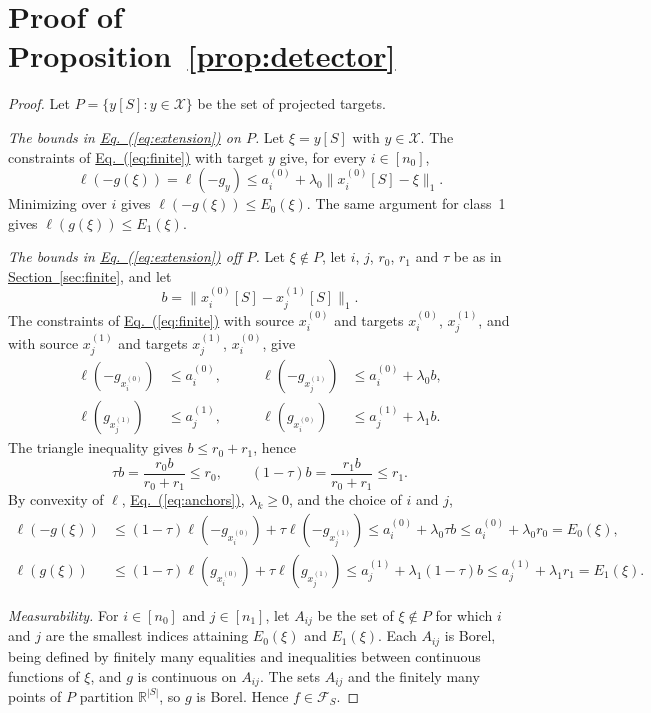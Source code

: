 \documentclass[11pt,a4paper]{article}
\newcommand{\Eqref}[1]{\hyperref[#1]{Eq.~(\ref*{#1})}}
\newcommand{\Secref}[1]{\hyperref[#1]{Section~\ref*{#1}}}
\theoremstyle{plain}
\begin{document}
\section{Proof of Proposition~\ref{prop:detector}}\label{app:detector}
\begin{proof}
Let $P=\{y[S]:y\in\mathcal X\}$ be the set of projected targets.

\emph{The bounds in \Eqref{eq:extension} on $P$.}
Let $\xi=y[S]$ with $y\in\mathcal X$. The constraints of
\Eqref{eq:finite} with target $y$ give, for every $i\in[n_0]$,
\[
\ell(-g(\xi))=\ell(-g_y)\le a_i^{(0)}+\lambda_0\|x_i^{(0)}[S]-\xi\|_1.
\]
Minimizing over $i$ gives $\ell(-g(\xi))\le E_0(\xi)$. The same
argument for class~1 gives $\ell(g(\xi))\le E_1(\xi)$.

\emph{The bounds in \Eqref{eq:extension} off $P$.}
Let $\xi\notin P$, let $i$, $j$, $r_0$, $r_1$ and $\tau$ be as in
\Secref{sec:finite}, and let
\[
b=\|x_i^{(0)}[S]-x_j^{(1)}[S]\|_1.
\]
The constraints of
\Eqref{eq:finite} with source $x_i^{(0)}$ and targets $x_i^{(0)}$,
$x_j^{(1)}$, and with source $x_j^{(1)}$ and targets $x_j^{(1)}$,
$x_i^{(0)}$, give
\begin{equation}\label{eq:anchors}
\begin{aligned}
\ell(-g_{x_i^{(0)}})&\le a_i^{(0)},&\qquad
\ell(-g_{x_j^{(1)}})&\le a_i^{(0)}+\lambda_0b,\\
\ell(g_{x_j^{(1)}})&\le a_j^{(1)},&\qquad
\ell(g_{x_i^{(0)}})&\le a_j^{(1)}+\lambda_1b.
\end{aligned}
\end{equation}
The triangle inequality gives $b\le r_0+r_1$, hence
\[
\tau b=\frac{r_0b}{r_0+r_1}\le r_0,\qquad
(1-\tau)b=\frac{r_1b}{r_0+r_1}\le r_1.
\]
By convexity of $\ell$, \Eqref{eq:anchors}, $\lambda_k\ge0$, and the
choice of $i$ and $j$,
\[
\begin{aligned}
\ell(-g(\xi))&\le(1-\tau)\ell(-g_{x_i^{(0)}})+\tau\ell(-g_{x_j^{(1)}})
\le a_i^{(0)}+\lambda_0\tau b\le a_i^{(0)}+\lambda_0r_0=E_0(\xi),\\
\ell(g(\xi))&\le(1-\tau)\ell(g_{x_i^{(0)}})+\tau\ell(g_{x_j^{(1)}})
\le a_j^{(1)}+\lambda_1(1-\tau)b\le a_j^{(1)}+\lambda_1r_1=E_1(\xi).
\end{aligned}
\]

\emph{Measurability.}
For $i\in[n_0]$ and $j\in[n_1]$, let $A_{ij}$ be the set of
$\xi\notin P$ for which $i$ and $j$ are the smallest indices attaining
$E_0(\xi)$ and $E_1(\xi)$. Each $A_{ij}$ is Borel, being defined by
finitely many equalities and inequalities between continuous functions
of $\xi$, and $g$ is continuous on $A_{ij}$. The sets $A_{ij}$ and the
finitely many points of $P$ partition $\mathbb R^{|S|}$, so $g$ is
Borel. Hence $f\in\mathcal F_S$.


\end{proof}
\end{document}
